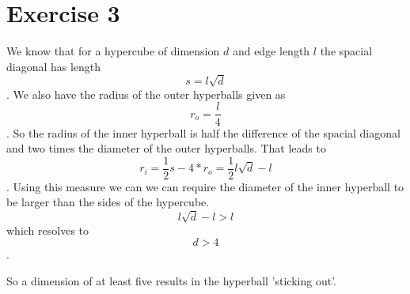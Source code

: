 \section*{Exercise 3}
We know that for a hypercube of dimension $d$ and edge length $l$ the spacial diagonal has length \[s = l\sqrt{d}\].
We also have the radius of the outer hyperballs given as \[r_o=\frac{l}{4}\].
So the radius of the inner hyperball is half the difference of the spacial diagonal and two times the diameter of the outer hyperballs.
That leads to \[r_i = \frac{1}{2}s - 4 * r_o = \frac{1}{2}l\sqrt{d}-l\].
Using this measure we can we can require the diameter of the inner hyperball to be larger than the sides of the hypercube.
\[l\sqrt{d}-l > l\]
which resolves to \[d>4\].

So a dimension of at least five results in the hyperball 'sticking out'.